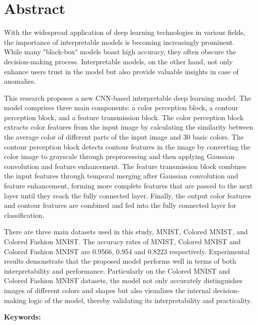 \documentclass[class=NCU_thesis, crop=false]{standalone}
\begin{document}
\chapter{Abstract}

With the widespread application of deep learning technologies in various fields, 
the importance of interpretable models is becoming increasingly prominent. 
While many "black-box" models boast high accuracy, they often obscure the decision-making process. 
Interpretable models, on the other hand, not only enhance users trust in the model but also provide valuable insights in case of anomalies.

This research proposes a new CNN-based interpretable deep learning model. 
The model comprises three main components: a color perception block, a contour perception block, and a feature transmission block. 
The color perception block extracts color features from the input image by calculating the similarity between the average color of different parts of the input image and 30 basic colors. 
The contour perception block detects contour features in the image by converting the color image to grayscale through preprocessing and then applying Gaussian convolution and feature enhancement. 
The feature transmission block combines the input features through temporal merging after Gaussian convolution and feature enhancement, forming more complete features that are passed to the next layer until they reach the fully connected layer. 
Finally, the output color features and contour features are combined and fed into the fully connected layer for classification.

There are three main datasets used in this study, MNIST, Colored MNIST, and Colored Fashion MNIST. 
The accuracy rates of MNIST, Colored MNIST and Colored Fashion MNIST are 0.9566, 0.954 and 0.8223 respectively.
Experimental results demonstrate that the proposed model performs well in terms of both interpretability and performance. 
Particularly on the Colored MNIST and Colored Fashion MNIST datasets, 
the model not only accurately distinguishes images of different colors and shapes but also visualizes the internal decision-making logic of the model, 
thereby validating its interpretability and practicality.

\vspace{2em}
\noindent \textbf{Keywords:} \keywordsEn{} %
\end{document}
